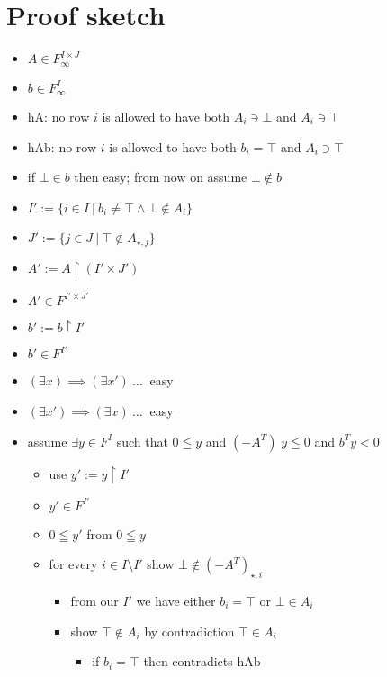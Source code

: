 \documentclass[]{article}
\begin{document}
\section{Proof sketch}

\renewcommand{\labelitemi}{$\bullet$}
\renewcommand{\labelitemii}{$\bullet$}
\renewcommand{\labelitemiii}{$\bullet$}
\renewcommand{\labelitemiv}{$\bullet$}

\begin{itemize}
\item $ A \in F_\infty^{I \times J} $
\item $ b \in F_\infty^{I} $
\item hA: no row $i$ is allowed to have both $A_{i} \ni \bot$ and $A_{i} \ni \top$
\item hAb: no row $i$ is allowed to have both $b_i = \top$ and $A_{i} \ni \top$
\item if $\bot \in b$ then easy; from now on assume $\bot \notin b$
\item $ I' := \{ i \in I ~|~ b_i \neq \top \wedge \bot \notin A_{i} \} $
\item $ J' := \{ j \in J ~|~ \top \notin A_{\star, j}  \} $
\item $ A' := A \restriction (I' \times J') $
\item $ A' \in F^{I' \times J'} $
\item $ b' := b \restriction I' $
\item $ b' \in F^{I'} $
\item $ (\exists x) \implies (\exists x') \ \dots \ $ easy
\item $ (\exists x') \implies (\exists x) \ \dots \ $ easy
\item assume $\exists y \in F^I$ such that $0 \leqq y$ and $(-A^T)\; y \leqq 0$ and $b^T y < 0$
\begin{itemize}
	\item use $y' := y \restriction I'$
	\item $ y' \in F^{I'} $
	\item $0 \leqq y'$ from $0 \leqq y$
	\item for every $i \in I \setminus I'$ show $ \bot \notin (-A^T)_{\star, i} $
	\begin{itemize}
		\item from our $I'$ we have either $ b_i = \top $ or $ \bot \in A_{i} $
		\item show $ \top \notin A_{i} $ by contradiction $ \top \in A_{i} $
		\begin{itemize}
			\item if $ b_i = \top $ then contradicts hAb

\end{itemize}
\end{itemize}
\end{itemize}
\end{itemize}
\end{document}
